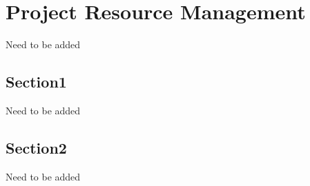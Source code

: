 \chapter{Project Resource Management}
Need to be added
\section{Section1}
Need to be added
\section{Section2}
Need to be added
